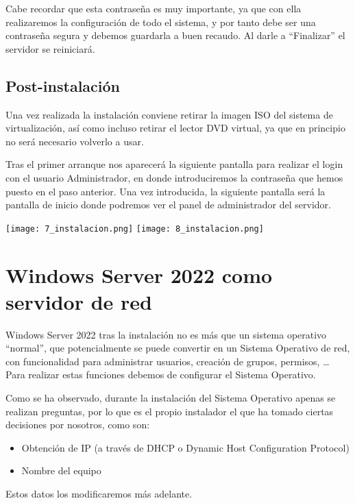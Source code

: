 Cabe recordar que esta contraseña es muy importante, ya que con ella realizaremos la configuración de todo el sistema, y por tanto debe ser una contraseña segura y debemos guardarla a buen recaudo. Al darle a “Finalizar” el servidor se reiniciará.

\section{Post-instalación}

Una vez realizada la instalación conviene retirar la imagen ISO del sistema de virtualización, así como incluso retirar el lector DVD virtual, ya que en principio no será necesario volverlo a usar.

Tras el primer arranque nos aparecerá la siguiente pantalla para realizar el login con el usuario Administrador, en donde introduciremos la contraseña que hemos puesto en el paso anterior. Una vez introducida, la siguiente pantalla será la pantalla de inicio donde podremos ver el panel de administrador del servidor.

\begin{tcolorbox}[title=Windows Server 2022 recién instalado,colback=white]
    \texttt{[image: 7\_instalacion.png]}
    \hfill
    \texttt{[image: 8\_instalacion.png]}
\end{tcolorbox}


\chapter{Windows Server 2022 como servidor de red}
Windows Server 2022 tras la instalación no es más que un sistema operativo “normal”, que potencialmente se puede convertir en un Sistema Operativo de red, con funcionalidad para administrar usuarios, creación de grupos, permisos, … Para realizar estas funciones debemos de configurar el Sistema Operativo.

Como se ha observado, durante la instalación del Sistema Operativo apenas se realizan preguntas, por lo que es el propio instalador el que ha tomado ciertas decisiones por nosotros, como son:

\begin{itemize}
    \item Obtención de IP (a través de DHCP o Dynamic Host Configuration Protocol)
    \item Nombre del equipo
\end{itemize}

Estos datos los modificaremos más adelante.


